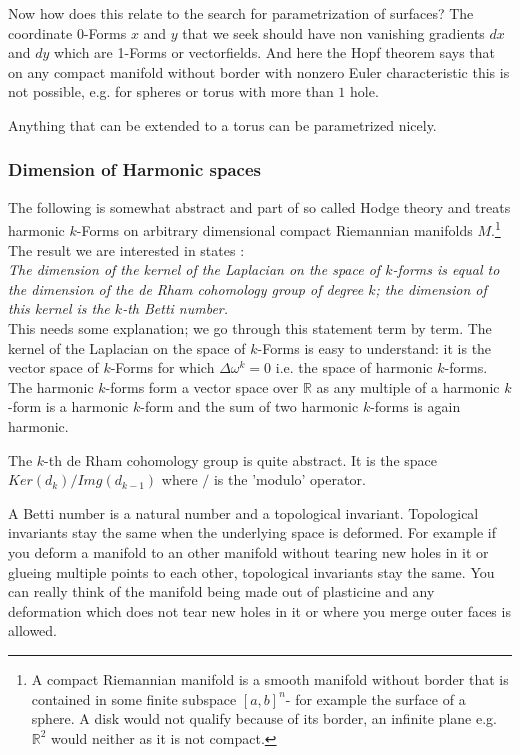 Now how does this relate to the search for parametrization of surfaces? The coordinate $0$-Forms $x$ and $y$ that we seek should have non vanishing gradients $dx$ and $dy$ which are 1-Forms or vectorfields. And here the Hopf theorem says that on any compact manifold without border with nonzero Euler characteristic this is not possible, e.g. for spheres or torus with more than $1$ hole. 

Anything that can be extended to a torus can be parametrized nicely.


\subsubsection{Dimension of Harmonic spaces }
The following is somewhat abstract and part of so called Hodge theory and treats harmonic $k$-Forms on arbitrary dimensional compact Riemannian manifolds $M$.\footnote{ A compact Riemannian manifold is a smooth manifold without border that is contained in some finite subspace $[a,b]^n$- for example the surface of a sphere. A disk would not qualify because of its border, an infinite plane e.g. $\mathbb R^2$ would neither as it is not compact.} The result we are interested in states : 
\[\]
\emph{The dimension of the kernel of the Laplacian on the space of $k$-forms is equal to the dimension of the de Rham cohomology group of degree $k$; the dimension of this kernel is the $k$-th Betti number.} 
\[\]
This needs some explanation; we go through this statement term by term. The kernel of the Laplacian on the space of $k$-Forms is easy to understand: it is the vector space of $k$-Forms for which $\Delta \omega^k = 0$ i.e. the space of harmonic $k$-forms. The harmonic $k$-forms form a vector space over $\mathbb R$ as any multiple of a harmonic $k$-form is a harmonic $k$-form and the sum of two harmonic $k$-forms is again harmonic.

The $k$-th de Rham cohomology group is quite abstract. It is the space $Ker(d_k)/Img(d_{k-1})$ where $/$ is the 'modulo' operator. 

A Betti number is a natural number and a topological invariant. Topological invariants stay the same when the underlying space is deformed. For example if you deform a manifold to an other manifold without tearing new holes in it or glueing multiple points to each other, topological invariants stay the same. You can really think of the manifold being made out of plasticine and any deformation which does not tear new holes in it or where you merge outer faces is allowed. 

